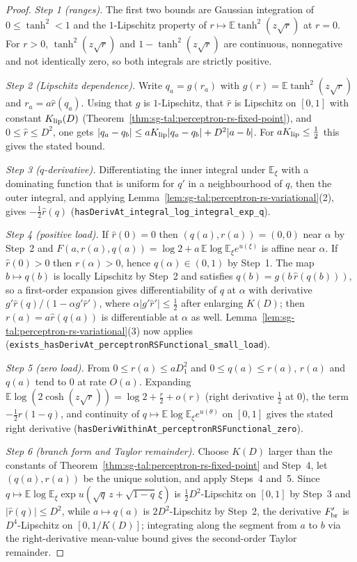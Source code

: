 \begin{proof}
  \leanok
\emph{Step 1 (ranges).} The first two bounds are Gaussian integration of $0\le\tanh^2<1$ and the
$1$-Lipschitz property of $r\mapsto\mathbb E\tanh^2(z\sqrt r)$ at $r=0$. For $r>0$,
$\tanh^2(z\sqrt r)$ and $1-\tanh^2(z\sqrt r)$ are continuous, nonnegative and not identically
zero, so both integrals are strictly positive.

\emph{Step 2 (Lipschitz dependence).} Write $q_a=g(r_a)$ with $g(r)=\mathbb E\tanh^2(z\sqrt r)$ and
$r_a=a\widehat r(q_a)$. Using that $g$ is $1$-Lipschitz, that $\widehat r$ is Lipschitz on $[0,1]$
with constant $K_{\rm lip}(D)$ (Theorem~\ref{thm:sg-tal:perceptron-rs-fixed-point}), and
$0\le\widehat r\le D^2$, one gets $|q_a-q_b|\le a K_{\rm lip}|q_a-q_b|+D^2|a-b|$. For
$aK_{\rm lip}\le\frac12$ this gives the stated bound.

\emph{Step 3 ($q$-derivative).} Differentiating the inner integral under $\mathbb E_\xi$ with a
dominating function that is uniform for $q'$ in a neighbourhood of $q$, then the outer integral,
and applying Lemma~\ref{lem:sg-tal:perceptron-rs-variational}(2), gives $-\frac12\widehat r(q)$
(\texttt{hasDerivAt\_integral\_log\_integral\_exp\_q}).

\emph{Step 4 (positive load).} If $\widehat r(0)=0$ then $(q(a),r(a))=(0,0)$ near $\alpha$ by
Step~2 and $F(a,r(a),q(a))=\log 2+a\,\mathbb E\log\mathbb E_\xi e^{u(\xi)}$ is affine near $\alpha$. If
$\widehat r(0)>0$ then $r(\alpha)>0$, hence $q(\alpha)\in(0,1)$ by Step~1. The map $b\mapsto q(b)$ is
locally Lipschitz by Step~2 and satisfies $q(b)=g(b\,\widehat r(q(b)))$, so a first-order expansion gives
differentiability of $q$ at $\alpha$ with derivative $g'\widehat r(q)/(1-\alpha g'\widehat r{}')$, where
$\alpha|g'\widehat r{}'|\le\frac12$ after enlarging $K(D)$; then $r(a)=a\widehat r(q(a))$ is
differentiable at $\alpha$ as well. Lemma~\ref{lem:sg-tal:perceptron-rs-variational}(3) now applies
(\texttt{exists\_hasDerivAt\_perceptronRSFunctional\_small\_load}).

\emph{Step 5 (zero load).} From $0\le r(a)\le aD_1^2$ and $0\le q(a)\le r(a)$, $r(a)$ and $q(a)$ tend
to $0$ at rate $O(a)$. Expanding $\mathbb E\log(2\cosh(z\sqrt r))=\log2+\frac r2+o(r)$ (right derivative
$\frac12$ at $0$), the term $-\frac12 r(1-q)$, and continuity of $q\mapsto\mathbb E\log\mathbb E_\xi
e^{u(\theta)}$ on $[0,1]$ gives the stated right derivative
(\texttt{hasDerivWithinAt\_perceptronRSFunctional\_zero}).

\emph{Step 6 (branch form and Taylor remainder).} Choose $K(D)$ larger than the constants of
Theorem~\ref{thm:sg-tal:perceptron-rs-fixed-point} and Step~4, let $(q(a),r(a))$ be the unique solution,
and apply Steps~4 and~5. Since $q\mapsto\mathbb E\log\mathbb E_\xi\exp u(\sqrt q\,z+\sqrt{1-q}\,\xi)$ is
$\frac12D^2$-Lipschitz on $[0,1]$ by Step~3 and $|\widehat r(q)|\le D^2$, while $a\mapsto q(a)$ is
$2D^2$-Lipschitz by Step~2, the derivative $F'_{\rm br}$ is $D^4$-Lipschitz on $[0,1/K(D)]$; integrating
along the segment from $a$ to $b$ via the right-derivative mean-value bound gives the second-order Taylor
remainder.


\end{proof}
